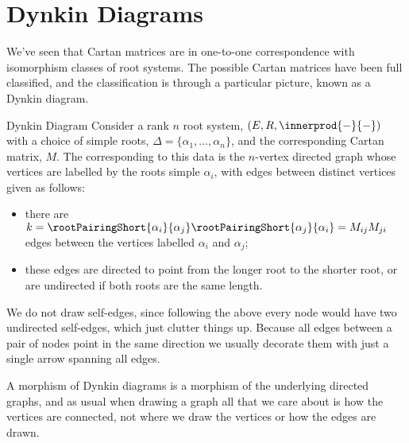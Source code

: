\documentclass[fleqn]{NotesClass}
\begin{document}
    \section{Dynkin Diagrams}
    We've seen that Cartan matrices are in one-to-one correspondence with isomorphism classes of root systems.
    The possible Cartan matrices have been full classified, and the classification is through a particular picture, known as a Dynkin diagram.
    
    \begin{dfn}{Dynkin Diagram}{}
        Consider a rank \(n\) root system, \((E, R, \innerprod{-}{-})\) with a choice of simple roots, \(\Delta = \{\alpha_1, \dotsc, \alpha_n\}\), and the corresponding Cartan matrix, \(M\).
        The  corresponding to this data is the \(n\)-vertex directed graph whose vertices are labelled by the roots simple \(\alpha_i\), with edges between distinct vertices given as follows:
        \begin{itemize}
            \item there are \(k = \rootPairingShort{\alpha_i}{\alpha_j} \rootPairingShort{\alpha_j}{\alpha_i} = M_{ij}M_{ji}\) edges between the vertices labelled \(\alpha_i\) and \(\alpha_j\);
            \item these edges are directed to point from the longer root to the shorter root, or are undirected if both roots are the same length.
        \end{itemize}
        We do not draw self-edges, since following the above every node would have two undirected self-edges, which just clutter things up.
        Because all edges between a pair of nodes point in the same direction we usually decorate them with just a single arrow spanning all edges.
    \end{dfn}
    
    A morphism of Dynkin diagrams is a morphism of the underlying directed graphs, and as usual when drawing a graph all that we care about is how the vertices are connected, not where we draw the vertices or how the edges are drawn.
    
\end{document}
